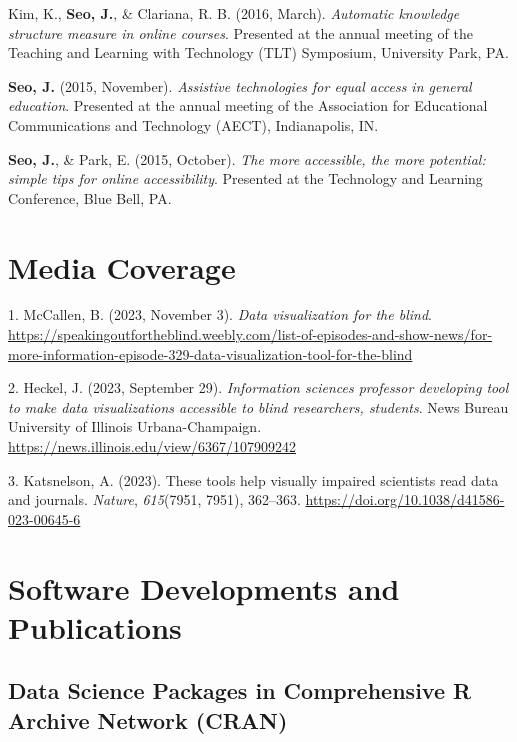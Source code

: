 \documentclass[11pt,a4paper,]{awesome-cv}
\newlength{\cslhangindent}
\newenvironment{CSLReferences}[2] %
 {\begin{list}{}{%
  \setlength{\itemindent}{0pt}
  \setlength{\leftmargin}{0pt}
  \setlength{\parsep}{0pt}
  \ifodd #1
   \setlength{\leftmargin}{\cslhangindent}
   \setlength{\itemindent}{-1\cslhangindent}
  \fi
  \setlength{\itemsep}{#2\baselineskip}}}
 {\end{list}}
\begin{document}
Kim, K., \textbf{Seo, J.}, \& Clariana, R. B. (2016, March).
\emph{Automatic knowledge structure measure in online courses}.
Presented at the annual meeting of the Teaching and Learning with
Technology (TLT) Symposium, University Park, PA.

\textbf{Seo, J.} (2015, November). \emph{Assistive technologies for
equal access in general education}. Presented at the annual meeting of
the Association for Educational Communications and Technology (AECT),
Indianapolis, IN.

\textbf{Seo, J.}, \& Park, E. (2015, October). \emph{The more
accessible, the more potential: simple tips for online accessibility}.
Presented at the Technology and Learning Conference, Blue Bell, PA.

\section{Media Coverage}\label{media-coverage}

\label{refs-37f5ad1f1850196509ec80c98fd22097}
\begin{CSLReferences}{1}{0}
1. McCallen, B. (2023, November 3). \emph{Data visualization for the
blind}.
\url{https://speakingoutfortheblind.weebly.com/list-of-episodes-and-show-news/for-more-information-episode-329-data-visualization-tool-for-the-blind}

2. Heckel, J. (2023, September 29). \emph{Information sciences professor
developing tool to make data visualizations accessible to blind
researchers, students}. News Bureau University of Illinois
Urbana-Champaign. \url{https://news.illinois.edu/view/6367/107909242}

3. Katsnelson, A. (2023). These tools help visually impaired scientists
read data and journals. \emph{Nature}, \emph{615}(7951, 7951), 362--363.
\url{https://doi.org/10.1038/d41586-023-00645-6}

\end{CSLReferences}

\section{Software Developments and
Publications}\label{software-developments-and-publications}

\subsection{Data Science Packages in Comprehensive R Archive Network
(CRAN)}\label{data-science-packages-in-comprehensive-r-archive-network-cran}
\end{document}
